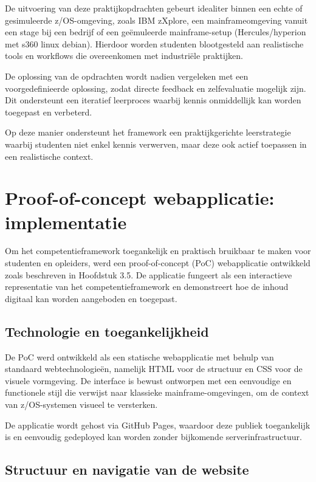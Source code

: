 De uitvoering van deze praktijkopdrachten gebeurt idealiter binnen een echte of gesimuleerde z/OS-omgeving, zoals IBM zXplore, een mainframeomgeving vanuit een stage bij een bedrijf of een geëmuleerde mainframe-setup (Hercules/hyperion met s360 linux debian). Hierdoor worden studenten blootgesteld aan realistische tools en workflows die overeenkomen met industriële praktijken.

De oplossing van de opdrachten wordt nadien vergeleken met een voorgedefinieerde oplossing, zodat directe feedback en zelfevaluatie mogelijk zijn. Dit ondersteunt een iteratief leerproces waarbij kennis onmiddellijk kan worden toegepast en verbeterd.

Op deze manier ondersteunt het framework een praktijkgerichte leerstrategie waarbij studenten niet enkel kennis verwerven, maar deze ook actief toepassen in een realistische context.

\section{Proof-of-concept webapplicatie: implementatie}

Om het competentieframework toegankelijk en praktisch bruikbaar te maken voor studenten en opleiders, werd een proof-of-concept (PoC) webapplicatie ontwikkeld zoals beschreven in Hoofdstuk 3.5. De applicatie fungeert als een interactieve representatie van het competentieframework en demonstreert hoe de inhoud digitaal kan worden aangeboden en toegepast.

\subsection{Technologie en toegankelijkheid}

De PoC werd ontwikkeld als een statische webapplicatie met behulp van standaard webtechnologieën, namelijk HTML voor de structuur en CSS voor de visuele vormgeving. De interface is bewust ontworpen met een eenvoudige en functionele stijl die verwijst naar klassieke mainframe-omgevingen, om de context van z/OS-systemen visueel te versterken.

De applicatie wordt gehost via GitHub Pages, waardoor deze publiek toegankelijk is en eenvoudig gedeployed kan worden zonder bijkomende serverinfrastructuur.

\subsection{Structuur en navigatie van de website}


